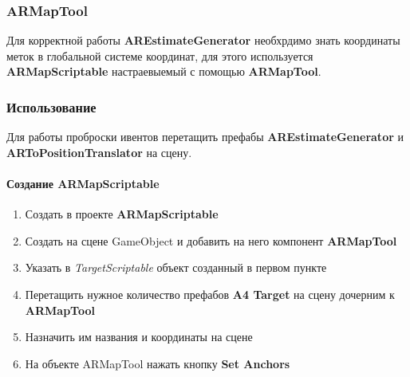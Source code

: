 \documentclass[a4paper, 11pt, titlepage]{article}
\begin{document}
      \subsubsection{ARMapTool}
        Для корректной работы \textbf{AREstimateGenerator} необхрдимо знать координаты меток в глобальной системе координат, для 
        этого используется \textbf{ARMapScriptable} настраевыемый с помощью \textbf{ARMapTool}.\\
        \begin{center}
        \end{center}  

      \subsubsection{Использование}
        Для работы проброски ивентов перетащить префабы \textbf{AREstimateGenerator} и \textbf{ARToPositionTranslator}
        на сцену.
        \paragraph{Создание ARMapScriptable}
          \begin{enumerate}
            \item Создать в проекте \textbf{ARMapScriptable}
            \item Создать на сцене GameObject и добавить на него компонент \textbf{ARMapTool}
            \item Указать в \textit{TargetScriptable} объект созданный в первом пункте
            \item Перетащить нужное количество префабов \textbf{A4 Target} на сцену дочерним к \textbf{ARMapTool}
            \item Назначить им названия и координаты на сцене
            \item На объекте ARMapTool нажать кнопку \textbf{Set Anchors}
          \end{enumerate}
\end{document}
